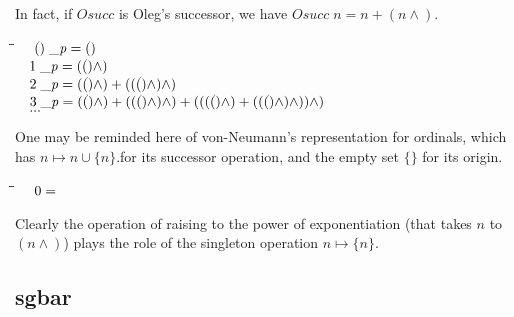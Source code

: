 \documentclass{article}
\newlength{\lwidth}\setlength{\lwidth}{4.5cm}
\newlength{\cwidth}\setlength{\cwidth}{8mm} %
\newcommand{\Conid}[1]{\mathit{#1}}
\newcommand{\Varid}[1]{\mathit{#1}}
\begin{document}
In fact, if \ensuremath{\Conid{Osucc}} is Oleg's successor, we have \ensuremath{\Conid{Osucc}\;\Varid{n}\mathrel{=}\Varid{n}\mathbin{+}(\Varid{n}\wedge)}. 
\begin{tabbing}
\qquad\=\hspace{\lwidth}\=\hspace{\cwidth}\=\+\kill
${\hskip0.50em\relax\hskip0.50em\relax(\!\mathop{{}^{{}^{\cdot}}}\!)\;\Varid{\char95 p}\mathrel{=}(\!\mathop{{}^{{}^{\cdot}}}\!)}$\\
${\hskip0.50em\relax\hskip0.50em\relax\mathrm{1}\;\Varid{\char95 p}\mathrel{=}((\!\mathop{{}^{{}^{\cdot}}}\!)\wedge)}$\\
${\hskip0.50em\relax\hskip0.50em\relax\mathrm{2}\;\Varid{\char95 p}\mathrel{=}((\!\mathop{{}^{{}^{\cdot}}}\!)\wedge)\mathbin{+}(((\!\mathop{{}^{{}^{\cdot}}}\!)\wedge)\wedge)}$\\
${\hskip0.50em\relax\hskip0.50em\relax\mathrm{3}\;\Varid{\char95 p}\mathrel{=}((\!\mathop{{}^{{}^{\cdot}}}\!)\wedge)\mathbin{+}(((\!\mathop{{}^{{}^{\cdot}}}\!)\wedge)\wedge)\mathbin{+}((((\!\mathop{{}^{{}^{\cdot}}}\!)\wedge)\mathbin{+}(((\!\mathop{{}^{{}^{\cdot}}}\!)\wedge)\wedge))\wedge)}$\\
${\hskip0.50em\relax\hskip0.50em\relax\mathbin{...}}$
\end{tabbing}
One may be reminded here of von-Neumann's representation for ordinals, which has $n \mapsto n \cup \{n\}$.for its successor operation,
and the empty set $\{\}$ for its origin.
\begin{tabbing}
\qquad\=\hspace{\lwidth}\=\hspace{\cwidth}\=\+\kill
${\hskip0.50em\relax\hskip0.50em\relax\mathrm{0}\mathrel{=}}$
\end{tabbing}Clearly the operation of raising to the power of exponentiation (that
takes \ensuremath{\Varid{n}} to \ensuremath{(\Varid{n}\wedge)}) plays the role of the singleton operation  $n \mapsto \{n\}$.


\subsection{sgbar}
\end{document}
